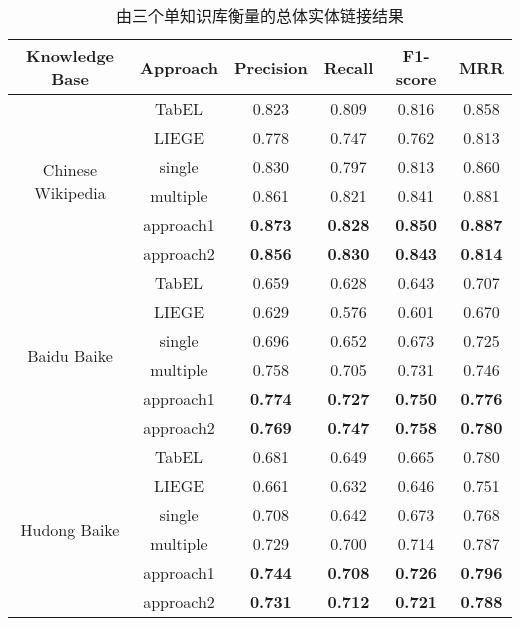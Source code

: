 \begin{table}[htbp]
\centering
\caption{由三个单知识库衡量的总体实体链接结果}
\label{result}
\begin{tabular}{|c|c|c|c|c|c|}
\hline
Knowledge Base & Approach & Precision & Recall & F1-score & MRR \\
\hline
\multirow{6}{*}{Chinese Wikipedia} & TabEL & 0.823 & 0.809 & 0.816 & 0.858 \\
\cline{2-6} & LIEGE & 0.778 & 0.747 & 0.762 & 0.813 \\
\cline{2-6} & single & 0.830 & 0.797 & 0.813 & 0.860 \\
\cline{2-6} & multiple & 0.861 & 0.821 & 0.841 & 0.881 \\
\cline{2-6} & approach1 & \textbf{0.873} & \textbf{0.828} & \textbf{0.850} & \textbf{0.887} \\
\cline{2-6} & approach2 & \textbf{0.856} & \textbf{0.830} & \textbf{0.843} & \textbf{0.814} \\
\hline
\multirow{6}{*}{Baidu Baike} & TabEL & 0.659 & 0.628 & 0.643 & 0.707 \\
\cline{2-6} & LIEGE & 0.629 & 0.576 & 0.601 & 0.670 \\
\cline{2-6} & single & 0.696 & 0.652 & 0.673 & 0.725 \\
\cline{2-6} & multiple & 0.758 & 0.705 & 0.731 & 0.746 \\
\cline{2-6} & approach1 & \textbf{0.774} & \textbf{0.727} & \textbf{0.750} & \textbf{0.776} \\
\cline{2-6} & approach2 & \textbf{0.769} & \textbf{0.747} & \textbf{0.758} & \textbf{0.780} \\
\hline
\multirow{6}{*}{Hudong Baike} & TabEL & 0.681 & 0.649 & 0.665 & 0.780 \\
\cline{2-6} & LIEGE & 0.661 & 0.632 & 0.646 & 0.751 \\
\cline{2-6} & single & 0.708 & 0.642 & 0.673 & 0.768 \\
\cline{2-6} & multiple & 0.729 & 0.700 & 0.714 & 0.787 \\
\cline{2-6} & approach1 & \textbf{0.744} & \textbf{0.708} & \textbf{0.726} & \textbf{0.796} \\
\cline{2-6} & approach2 & \textbf{0.731} & \textbf{0.712} & \textbf{0.721} & \textbf{0.788} \\
\hline
\end{tabular}
\end{table}


